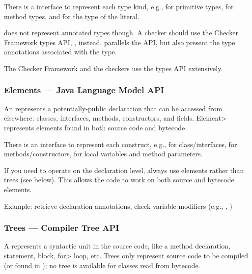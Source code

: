 \begin{sloppypar}
There is a  interface to represent each type kind,
e.g.,  for primitive types, 
for method types, and  for the type of the  literal.
\end{sloppypar}

 does not represent annotated types though.  A checker
should use the Checker Framework types API,
, instead.  
parallels the  API, but also present the type annotations
associated with the type.

The Checker Framework and the checkers use the types API extensively.


\subsubsection{Elements --- Java Language Model API\label{javac-elements}}

An  represents a potentially-public
declaration that can be accessed from elsewhere:  classes, interfaces, methods, constructors, and
fields.  \<Element> represents elements found in both source
code and bytecode.

There is an  interface to represent each construct, e.g.,
 for class/interfaces,  for
methods/constructors,  for local variables and
method parameters.

If you need to operate on the declaration level, always use elements rather
than trees
(see below).  This allows the code to work on
both source and bytecode elements.

Example: retrieve declaration annotations, check variable
modifiers (e.g., , )


\subsubsection{Trees --- Compiler Tree API\label{javac-trees}}

A  represents a syntactic unit in the source code,
like a method declaration, statement, block, \<for> loop, etc. Trees only
represent source code to be compiled (or found in );
no tree is available for classes read from bytecode.

